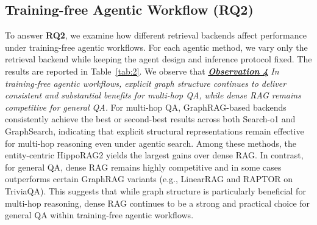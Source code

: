 \subsection{Training-free Agentic Workflow (RQ2)}
To answer \textbf{RQ2}, we examine how different retrieval backends affect performance under training-free agentic workflows. For each agentic method, we vary only the retrieval backend while keeping the agent design and inference protocol fixed. The results are reported in Table~\ref{tab:2}. We observe that \textbf{\textit{\underline{Observation 4}}} \textit{In training-free agentic workflows, explicit graph structure continues to deliver consistent and substantial benefits for multi-hop QA, while dense RAG remains competitive for general QA.} For multi-hop QA, GraphRAG-based backends consistently achieve the best or second-best results across both Search-o1 and GraphSearch, indicating that explicit structural representations remain effective for multi-hop reasoning even under agentic search. Among these methods, the entity-centric HippoRAG2 yields the largest gains over dense RAG. In contrast, for general QA, dense RAG remains highly competitive and in some cases outperforms certain GraphRAG variants (e.g., LinearRAG and RAPTOR on TriviaQA). This suggests that while graph structure is particularly beneficial for multi-hop reasoning, dense RAG continues to be a strong and practical choice for general QA within training-free agentic workflows.



